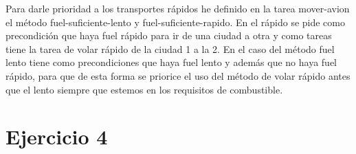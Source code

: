 \documentclass[12pt,a4paper]{article}
\begin{document}
Para darle prioridad a los transportes rápidos he definido en la tarea mover-avion el método fuel-suficiente-lento y fuel-suficiente-rapido. En el rápido se pide como precondición que haya fuel rápido para ir de una ciudad a otra y como tareas tiene la tarea de volar rápido de la ciudad 1 a la 2. En el caso del método fuel lento tiene como precondiciones que haya fuel lento y además que no haya fuel rápido, para que de esta forma se priorice el uso del método de volar rápido antes que el lento siempre que estemos en los requisitos de combustible.

\section{Ejercicio 4}
\end{document}
